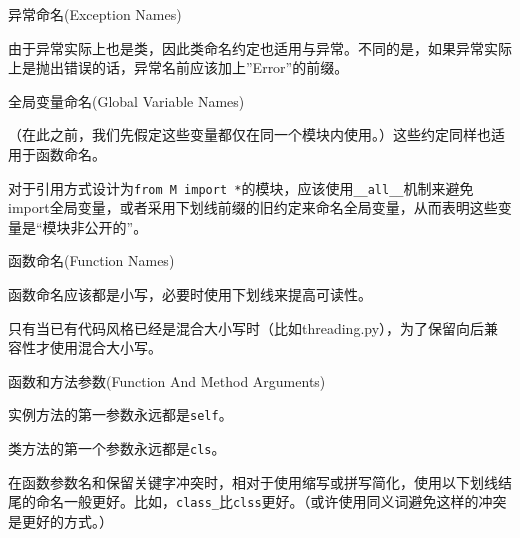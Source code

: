 \documentclass[ignorenonframetext,9pt]{beamer}
\begin{document}
\begin{frame}[fragile]

\begin{block}{异常命名(Exception Names)}

由于异常实际上也是类，因此类命名约定也适用与异常。不同的是，如果异常实际上是抛出错误的话，异常名前应该加上''Error''的前缀。

\end{block}

\begin{block}{全局变量命名(Global Variable Names)}

（在此之前，我们先假定这些变量都仅在同一个模块内使用。）这些约定同样也适用于函数命名。

对于引用方式设计为\texttt{from\ M\ import\ *}的模块，应该使用\texttt{\_\_all\_\_}机制来避免import全局变量，或者采用下划线前缀的旧约定来命名全局变量，从而表明这些变量是``模块非公开的''。

\end{block}



\end{frame}

\begin{frame}[fragile]
\begin{block}{函数命名(Function Names)}

函数命名应该都是小写，必要时使用下划线来提高可读性。

只有当已有代码风格已经是混合大小写时（比如threading.py），为了保留向后兼容性才使用混合大小写。

\end{block}

\begin{block}{函数和方法参数(Function And Method Arguments)}

实例方法的第一参数永远都是\texttt{self}。

类方法的第一个参数永远都是\texttt{cls}。

在函数参数名和保留关键字冲突时，相对于使用缩写或拼写简化，使用以下划线结尾的命名一般更好。比如，\texttt{class\_}比\texttt{clss}更好。（或许使用同义词避免这样的冲突是更好的方式。）

\end{block}



\end{frame}
\end{document}
